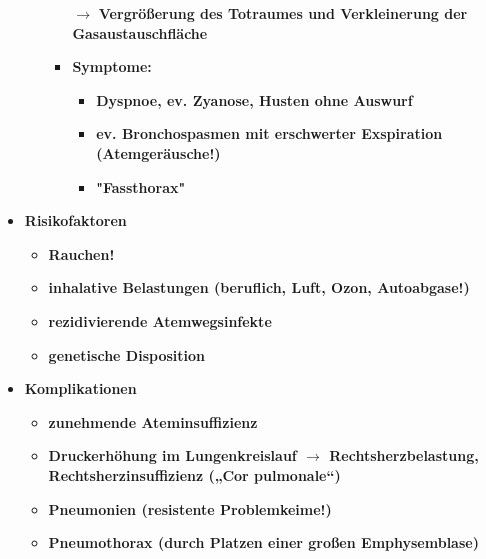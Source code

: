 \begin{itemize}
\begin{itemize}
\begin{itemize}
							\item[$\rightarrow$] \textbf{Vergrößerung des Totraumes und Verkleinerung der Gasaustauschfläche}
							\item \textbf{Symptome:}
								\begin{itemize}
									\item \textbf{Dyspnoe, ev. Zyanose, Husten ohne Auswurf}
									\item \textbf{ev. Bronchospasmen mit erschwerter Exspiration (Atemgeräusche!)}
									\item \textbf{"Fassthorax"}
								\end{itemize}
						\end{itemize}
				\end{itemize}
			\item \textbf{Risikofaktoren}
				\begin{itemize}
					\item \textbf{Rauchen!}
					\item \textbf{inhalative Belastungen (beruflich, Luft, Ozon, Autoabgase!)}
					\item \textbf{rezidivierende Atemwegsinfekte}
					\item \textbf{genetische Disposition}
				\end{itemize}
			\item \textbf{Komplikationen}
				\begin{itemize}
					\item \textbf{zunehmende Ateminsuffizienz}
					\item \textbf{Druckerhöhung im Lungenkreislauf $\rightarrow$ Rechtsherzbelastung, Rechtsherzinsuffizienz („Cor pulmonale“)}
					\item \textbf{Pneumonien (resistente Problemkeime!)}
					\item \textbf{Pneumothorax (durch Platzen einer großen Emphysemblase)}
				\end{itemize}
		\end{itemize}
